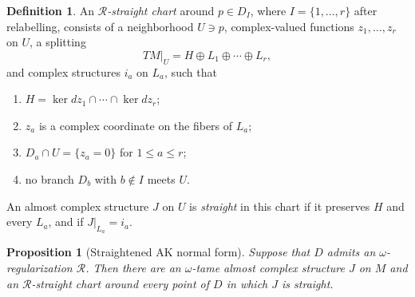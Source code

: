 \documentclass[11pt]{article}
\newtheorem{proposition}[theorem]{Proposition}
\theoremstyle{definition}
\newtheorem{definition}[theorem]{Definition}
\theoremstyle{remark}
\begin{document}
\begin{definition}\label{def:straight-chart}
An \emph{\(\mathcal R\)-straight chart} around \(p\in D_I\), where
\(I=\{1,\ldots,r\}\) after relabelling, consists of a neighborhood \(U\ni p\),
complex-valued functions \(z_1,\ldots,z_r\) on \(U\), a splitting
\[
TM|_U=H\oplus L_1\oplus\cdots\oplus L_r,
\]
and complex structures \(i_a\) on \(L_a\), such that
\begin{enumerate}
\item \(H=\ker dz_1\cap\cdots\cap\ker dz_r\);
\item \(z_a\) is a complex coordinate on the fibers of \(L_a\);
\item \(D_a\cap U=\{z_a=0\}\) for \(1\leq a\leq r\);
\item no branch \(D_b\) with \(b\notin I\) meets \(U\).
\end{enumerate}
An almost complex structure \(J\) on \(U\) is \emph{straight} in this chart if
it preserves \(H\) and every \(L_a\), and if \(J|_{L_a}=i_a\).
\end{definition}

\begin{proposition}[Straightened AK normal form]\label{prop:straight-AK}
Suppose that \(D\) admits an \(\omega\)-regularization \(\mathcal R\). Then
there are an \(\omega\)-tame almost complex structure \(J\) on \(M\) and an
\(\mathcal R\)-straight chart around every point of \(D\) in which \(J\) is
straight.
\end{proposition}
\end{document}

